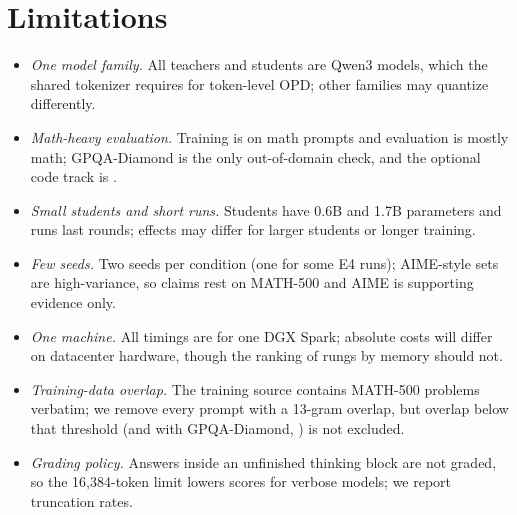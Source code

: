 \section{Limitations}\label{sec:limitations}

\begin{itemize}
  \item \emph{One model family.} All teachers and students are Qwen3 models, which the shared
        tokenizer requires for token-level OPD; other families may quantize differently.
  \item \emph{Math-heavy evaluation.} Training is on math prompts and evaluation is mostly math;
        GPQA-Diamond is the only out-of-domain check, and the optional code track is
        \TBD{} .
  \item \emph{Small students and short runs.} Students have 0.6B and 1.7B parameters and runs
        last \nRounds{} rounds; effects may differ for larger students or longer training.
  \item \emph{Few seeds.} Two seeds per condition (one for some E4 runs); AIME-style sets are
        high-variance, so claims rest on MATH-500 and AIME is supporting evidence only.
  \item \emph{One machine.} All timings are for one DGX Spark; absolute costs will differ on
        datacenter hardware, though the ranking of rungs by memory should not.
  \item \emph{Training-data overlap.} The training source contains MATH-500 problems verbatim;
        we remove every prompt with a 13-gram overlap, but overlap below that threshold (and with
        GPQA-Diamond, \TBD{}) is not excluded.
  \item \emph{Grading policy.} Answers inside an unfinished thinking block are not graded, so the
        16{,}384-token limit lowers scores for verbose models; we report truncation rates.
\end{itemize}
